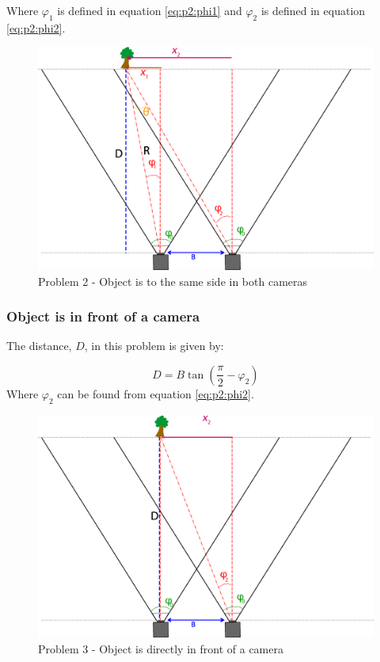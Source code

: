 Where $\varphi_1$ is defined in equation \eqref{eq:p2:phi1} and $\varphi_2$ is defined in equation \eqref{eq:p2:phi2}. 

\begin{figure}
\includegraphics[width=\textwidth,height=\textheight,keepaspectratio]{Figures/problem2.png}
\caption{Problem 2 - Object is to the same side in both cameras}
\label{problem_toleft}
\end{figure}

\subsubsection{Object is in front of a camera}
The distance, $D$, in this problem is given by:

\begin{equation} \label{eq:p3:D}
D = B \tan(\frac{\pi}{2} - \varphi_{2})
\end{equation}
Where $\varphi_2$ can be found from equation \ref{eq:p2:phi2}. 
\begin{figure}
\includegraphics[width=\textwidth,height=\textheight,keepaspectratio]{Figures/problem3.png}
\caption{Problem 3 - Object is directly in front of a camera}
\label{fig:problem_infront}
\end{figure}

